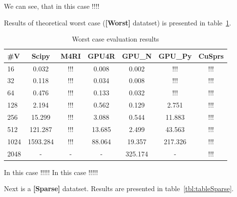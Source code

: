 We can see, that in this case !!!!

                                                                                                     
Results of theoretical worst case (\textbf{[Worst]} datatset) is presented in table~\ref{tbl:tableWorst}.

                                                                                                     

\begin{table}[H]
\caption{Worst case evaluation results}
\label{tbl:tableWorst}
\begin{tabular}{| l | c | c | c | c | c | c | }
    \hline
    \#V  & Scipy    & M4RI    & GPU4R  & GPU\_N  & GPU\_Py & CuSprs  \\
    \hline
    \hline
    16   & 0.032    & !!!     & 0.008  & 0.002   & !!!     & !!!     \\
    32   & 0.118    & !!!     & 0.034  & 0.008   & !!!     & !!!     \\
    64   & 0.476    & !!!     & 0.133  & 0.032   & !!!     & !!!     \\
    128  & 2.194    & !!!     & 0.562  & 0.129   & 2.751   & !!!     \\
    256  & 15.299   & !!!     & 3.088  & 0.544   & 11.883  & !!!     \\
    512  & 121.287  & !!!     & 13.685 & 2.499   & 43.563  & !!!     \\
    1024 & 1593.284 & !!!     & 88.064 & 19.357  & 217.326 & !!!     \\
    2048 & -        & -       & -      & 325.174 & -       & !!!     \\
    \hline
  \end{tabular}
\end{table}


In this case !!!!!
In this case !!!!!

Next is a \textbf{[Sparse]} datatset.
Results are presented in table~\ref{tbl:tableSparse}.

